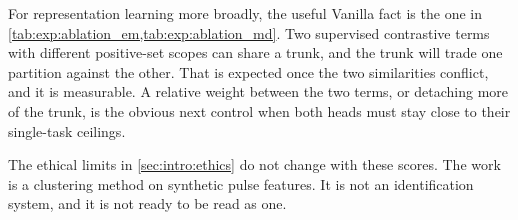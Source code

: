 For representation learning more broadly, the useful Vanilla fact is the one in \cref{tab:exp:ablation_em,tab:exp:ablation_md}.
Two supervised contrastive terms with different positive-set scopes can share a trunk, and the trunk will trade one partition against the other.
That is expected once the two similarities conflict, and it is measurable.
A relative weight between the two terms, or detaching more of the trunk, is the obvious next control when both heads must stay close to their single-task ceilings.

The ethical limits in \cref{sec:intro:ethics} do not change with these scores.
The work is a clustering method on synthetic pulse features.
It is not an identification system, and it is not ready to be read as one.
